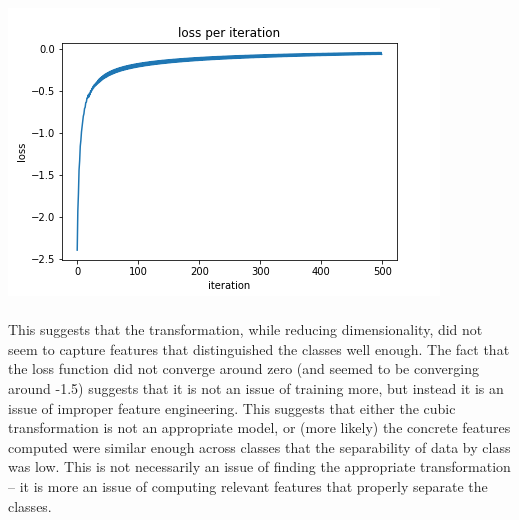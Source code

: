 \documentclass[11pt]{article}
\begin{document}
\includegraphics[scale=0.2]{images/loss_no_transform_0003}\\
 \\
 This suggests that the transformation, while reducing dimensionality, did not seem to capture features that distinguished the classes well enough. The fact that the loss function did not converge around zero (and seemed to be converging around -1.5) suggests that it is not an issue of training more, but instead it is an issue of improper feature engineering. This suggests that either the cubic transformation is not an appropriate model, or (more likely) the concrete features computed were similar enough across classes that the separability of data by class was low. This is not necessarily an issue of finding the appropriate transformation – it is more an issue of computing relevant features that properly separate the classes.
\end{document}

